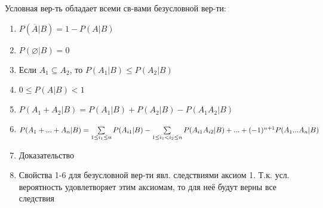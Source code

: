 \SLED Условная вер-ть обладает всеми св-вами безусловной вер-ти:
\begin{enumerate}[topsep=0pt, leftmargin=20pt, noitemsep]
	\item $P(\overline{A}|B) = 1 - P(A|B)$
	
	\item $P(\varnothing|B) = 0$
	
	\item Если $A_1\subseteq A_2$, то $P(A_1|B)\leq P(A_2|B)$
	
	\item $0\leq P(A|B) < 1$
	
	\item $P(A_1+A_2|B)=P(A_1|B)+P(A_2|B)-P(A_1A_2|B)$
	
	\item $P(A_1+...+A_n|B) = \sum\limits_{1\leq i_1\leq n} P(A_{i1}|B)-\sum\limits_{1\leq i_1<i_2\leq n}P(A_{i1}A_{i2}|B)+...+(-1)^{n+1}P(A_1...A_n|B)$
	
	\item [] Доказательство
	
	\item [] Свойства 1-6 для безусловной вер-ти явл. следствиями аксиом 1\degree. Т.к. усл. вероятность удовлетворяет этим аксиомам, то для неё будут верны все следствия
	
\end{enumerate}

\clearpage
